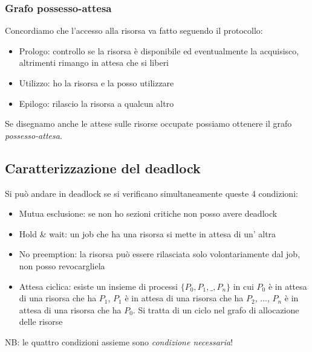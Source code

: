 \subsubsection{Grafo possesso-attesa}
Concordiamo che l'accesso alla risorsa va fatto seguendo il protocollo:
\begin{itemize}
    \item Prologo: controllo se la risorsa è disponibile ed eventualmente la acquisisco, altrimenti rimango in attesa che si liberi
    \item Utilizzo: ho la risorsa e la posso utilizzare
    \item Epilogo: rilascio la risorsa a qualcun altro
\end{itemize}

Se disegnamo anche le attese sulle risorse occupate possiamo ottenere il grafo \emph{possesso-attesa}.

\subsection{Caratterizzazione del deadlock}
Si può andare in deadlock se si verificano simultaneamente queste 4 condizioni:
\begin{itemize}
    \item Mutua esclusione: se non ho sezioni critiche non posso avere deadlock
    \item Hold \& wait: un job che ha una risorsa si mette in attesa di un' altra
    \item No preemption: la risorsa può essere rilasciata solo volontariamente dal job, non posso revocargliela
    \item Attesa ciclica: esiste un insieme di processi $\{ P_0, P_1, \_, P_n \}$ in cui $P_0$ è in attesa di una risorsa che ha $P_1$, $P_1$ è in attesa di una risorsa che ha $P_2$, ..., $P_n$ è in attesa di una risorsa che ha $P_0$.
    Si tratta di un ciclo nel grafo di allocazione delle risorse
\end{itemize}

NB: le quattro condizioni assieme sono \emph{condizione necessaria}!

